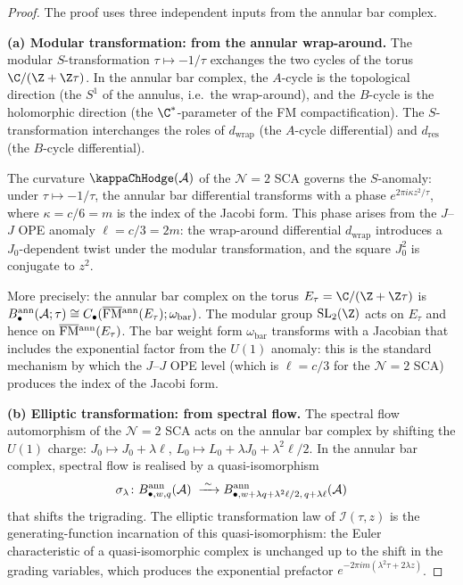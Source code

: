 \begin{proof}
The proof uses three independent inputs from the annular
bar complex.

\medskip\noindent
\textbf{(a) Modular transformation: from the annular
wrap-around.}
The modular $S$-transformation
$\tau\mapsto -1/\tau$ exchanges the two cycles of the
torus $\C/(\Z+\Z\tau)$.
In the annular bar complex, the $A$-cycle is the
topological direction (the $S^1$ of the annulus, i.e.\
the wrap-around), and the $B$-cycle is the holomorphic
direction (the $\C^*$-parameter of the FM
compactification). The $S$-transformation interchanges
the roles of $d_{\mathrm{wrap}}$ (the $A$-cycle
differential) and $d_{\mathrm{res}}$ (the $B$-cycle
differential).

The curvature $\kappaChHodge(\cA)$ of the $\mathcal N=2$ SCA
governs the $S$-anomaly: under $\tau\mapsto -1/\tau$,
the annular bar differential transforms with a phase
$e^{2\pi i\kappa z^2/\tau}$, where $\kappa = c/6 = m$
is the index of the Jacobi form. This phase arises from
the $J$--$J$ OPE anomaly $\ell = c/3 = 2m$: the
wrap-around differential $d_{\mathrm{wrap}}$ introduces a
$J_0$-dependent twist under the modular transformation,
and the square $J_0^2$ is conjugate to $z^2$.

More precisely: the annular bar complex on the torus
$E_\tau = \C/(\Z+\Z\tau)$ is
$B^{\mathrm{ann}}_\bullet(\mathcal{A};\tau)
\cong C_\bullet(\overline{\mathrm{FM}}{}^{\mathrm{ann}}(E_\tau);
\omega_{\mathrm{bar}})$.
The modular group $\mathrm{SL}_2(\Z)$ acts on $E_\tau$
and hence on $\overline{\mathrm{FM}}{}^{\mathrm{ann}}(E_\tau)$.
The bar weight form $\omega_{\mathrm{bar}}$ transforms
with a Jacobian that includes the exponential factor
from the $U(1)$ anomaly: this is the standard mechanism
by which the $J$--$J$ OPE level
(which is $\ell = c/3$ for the $\mathcal N=2$ SCA)
produces the index of the Jacobi form.

\medskip\noindent
\textbf{(b) Elliptic transformation: from spectral flow.}
The spectral flow automorphism of the $\mathcal N=2$ SCA
acts on the annular bar complex by shifting the $U(1)$
charge: $J_0\mapsto J_0 + \lambda\ell$,
$L_0\mapsto L_0 + \lambda J_0 + \lambda^2\ell/2$.
In the annular bar complex, spectral flow is realised by
a quasi-isomorphism
\[
\sigma_\lambda\colon
B^{\mathrm{ann}}_{\bullet,w,q}(\mathcal{A})
\;\xrightarrow{\;\sim\;}
B^{\mathrm{ann}}_{\bullet,w+\lambda q+\lambda^2\ell/2,\,
q+\lambda\ell}(\mathcal{A})
\]
that shifts the trigrading. The elliptic transformation
law of $\mathcal{I}(\tau,z)$ is the generating-function
incarnation of this quasi-isomorphism: the Euler
characteristic of a quasi-isomorphic complex is unchanged
up to the shift in the grading variables, which produces
the exponential prefactor
$e^{-2\pi i m(\lambda^2\tau+2\lambda z)}$.


\end{proof}
